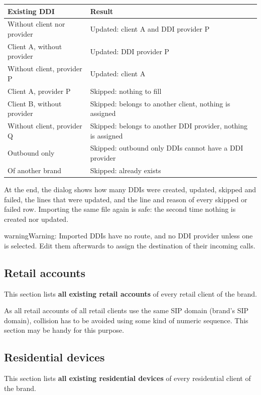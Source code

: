 \documentclass[letterpaper,10pt,english]{sphinxmanual}
\begin{document}
\noindent\begin{tabulary}{\linewidth}{|L|L|}
\hline
\textsf{\relax 
Existing DDI
\unskip}\relax &\textsf{\relax 
Result
\unskip}\relax \\
\hline
Without client nor provider
&
Updated: client A and DDI provider P
\\
\hline
Client A, without provider
&
Updated: DDI provider P
\\
\hline
Without client, provider P
&
Updated: client A
\\
\hline
Client A, provider P
&
Skipped: nothing to fill
\\
\hline
Client B, without provider
&
Skipped: belongs to another client, nothing is assigned
\\
\hline
Without client, provider Q
&
Skipped: belongs to another DDI provider, nothing is assigned
\\
\hline
Outbound only
&
Skipped: outbound only DDIs cannot have a DDI provider
\\
\hline
Of another brand
&
Skipped: already exists
\\
\hline\end{tabulary}


At the end, the dialog shows how many DDIs were created, updated, skipped and failed, the lines
that were updated, and the line and reason of every skipped or failed row. Importing the same
file again is safe: the second time nothing is created nor updated.

\begin{notice}{warning}{Warning:}
Imported DDIs have no route, and no DDI provider unless one is selected. Edit them
afterwards to assign the destination of their incoming calls.
\end{notice}


\subsection{Retail accounts}
\label{administration_portal/brand/views/retail_accounts::doc}\label{administration_portal/brand/views/retail_accounts:retail-accounts}
This section lists \textbf{all existing retail accounts} of every retail client of the brand.

As all retail accounts of all retail clients use the same SIP domain (brand's SIP domain), collision has to be
avoided using some kind of numeric sequence. This section may be handy for this purpose.


\subsection{Residential devices}
\label{administration_portal/brand/views/residential_devices::doc}\label{administration_portal/brand/views/residential_devices:residential-devices}
This section lists \textbf{all existing residential devices} of every residential client of the brand.
\end{document}
